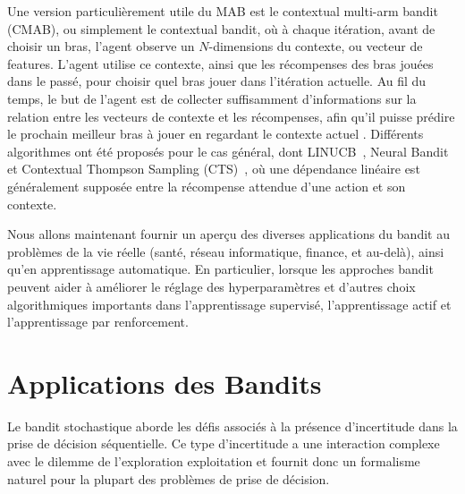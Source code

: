 \documentclass[conference]{IEEEtran}
\newcommand{\1}[1]{\mathbbm{1}_{\left\{#1\right\}}}
\begin{document}
Une version particulièrement utile du MAB est le contextual multi-arm bandit (CMAB), ou simplement le contextual bandit, où à chaque itération, avant de choisir un bras, l'agent observe un $N$-dimensions du contexte, ou vecteur de features.
L'agent utilise ce contexte, ainsi que les récompenses des bras jouées dans le passé, pour choisir quel bras jouer dans l'itération actuelle. Au fil du temps, le but de l'agent est de collecter suffisamment d'informations sur la relation entre les vecteurs de contexte et les récompenses, afin qu'il puisse prédire le prochain meilleur bras à jouer en regardant le contexte actuel \cite{langford2008epoch,AgrawalG13}. Différents algorithmes ont été proposés pour le cas général, dont LINUCB~\cite{Li2010}, Neural Bandit \cite{AllesiardoFB14} et Contextual Thompson Sampling (CTS)~\cite{AgrawalG13}, où une dépendance linéaire est généralement supposée entre la récompense attendue d'une action et son contexte. 

Nous allons maintenant fournir un aperçu des diverses applications du bandit au problèmes de la vie réelle (santé, réseau informatique, finance, et au-delà), ainsi qu'en apprentissage automatique. En particulier, lorsque les approches bandit peuvent aider à améliorer le réglage des hyperparamètres et d'autres choix algorithmiques importants dans l'apprentissage supervisé, l'apprentissage actif et l'apprentissage par renforcement. 

\section{Applications des Bandits }
Le bandit stochastique aborde les défis associés à la présence d'incertitude dans la prise de décision séquentielle. Ce type d'incertitude a une interaction complexe avec le dilemme de l'exploration exploitation et fournit donc un formalisme naturel pour la plupart des problèmes de prise de décision.
\end{document}

